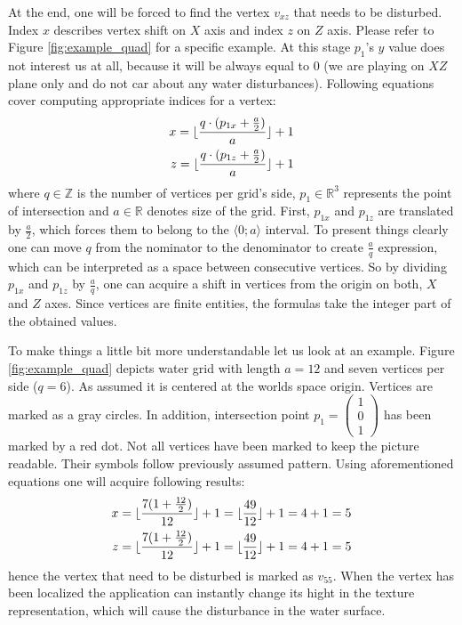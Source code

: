 \documentclass{report}
\DeclarePairedDelimiter\floor{\lfloor}{\rfloor}
\begin{document}
At the end, one will be forced to find the vertex $v_{xz}$ that needs to be disturbed. Index $x$ describes vertex shift on $X$ axis and index $z$ on $Z$ axis. Please refer to Figure \ref{fig:example_quad} for a specific example. At this stage $p_1$'s $y$ value does not interest us at all, because it will be always equal to $0$ (we are playing on $XZ$ plane only and do not car about any water disturbances). Following equations cover computing appropriate indices for a vertex:
\begin{equation}
\begin{split}
x = \floor{\frac{q \cdot (p_{1x} + \frac{a}{2})}{a}} + 1\\
z = \floor{\frac{q \cdot (p_{1z} + \frac{a}{2})}{a}} + 1
\end{split}
\end{equation}
where $q \in \mathbb{Z}$ is the number of vertices per grid's side, $p_1 \in \mathbb{R}^{3}$ represents the point of intersection and $a \in \mathbb{R}$ denotes size of the grid. First, $p_{1x}$ and $p_{1z}$ are translated by $\frac{a}{2}$, which forces them to belong to the $\langle 0 ; a \rangle$ interval. To present things clearly one can move $q$ from the nominator to the denominator to create $\frac{a}{q}$ expression, which can be interpreted as a space between consecutive vertices. So by dividing $p_{1x}$ and $p_{1z}$ by $\frac{a}{q}$, one can acquire a shift in vertices from the origin on both, $X$ and $Z$ axes. Since vertices are finite entities, the formulas take the integer part of the obtained values. 

To make things a little bit more understandable let us look at an example. Figure \ref{fig:example_quad} depicts water grid with length  $a=12$ and seven vertices per side ($q=6$). As assumed it is centered at the worlds space origin. Vertices are marked as a gray circles. In addition, intersection point $p_1 = \left(\begin{smallmatrix}1 \\ 0 \\1 \end{smallmatrix}\right)$ has been marked by a red dot. Not all vertices have been marked to keep the picture readable. Their symbols follow previously assumed pattern. Using aforementioned equations one will acquire following results:
\begin{equation*}
\begin{split}
x = \floor{\frac{7 (1 + \frac{12}{2})}{12}} + 1 = \floor{\frac{49}{12}} + 1 = 4  + 1 = 5 \\
z = \floor{\frac{7 (1 + \frac{12}{2})}{12}} + 1 = \floor{\frac{49}{12}} + 1 = 4  + 1 = 5
\end{split}
\end{equation*}
hence the vertex that need to be disturbed is marked as $v_{55}$. When the vertex has been localized the application can instantly change its hight in the texture representation, which will cause the disturbance in the water surface.
\end{document}
